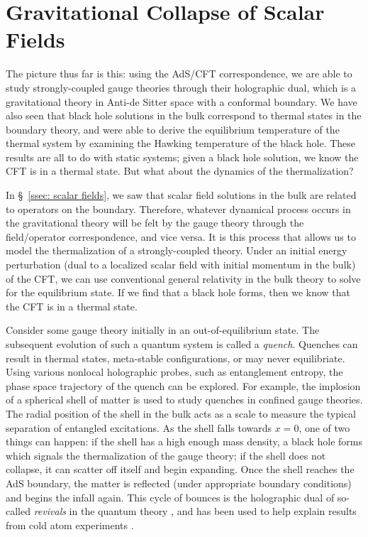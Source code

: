 \documentclass[../PhD.tex]{subfiles}
\begin{document}

\section{Gravitational Collapse of Scalar Fields}
\label{sec: grav collapse}

The picture thus far is this: using the AdS/CFT correspondence, we are able to study strongly-coupled gauge theories through their holographic dual, which is a gravitational theory in Anti-de Sitter space with a conformal boundary. We have also seen that black hole solutions in the bulk correspond to thermal states in the boundary theory, and were able to derive the equilibrium temperature of the thermal system by examining the Hawking temperature of the black hole. These results are all to do with static systems; given a black hole solution, we know the CFT is in a thermal state. But what about the dynamics of the thermalization? 

In \S~\!\ref{ssec: scalar fields}, we saw that scalar field solutions in the bulk are related to operators on the boundary. Therefore, whatever dynamical process occurs in the gravitational theory will be felt by the gauge theory through the field/operator correspondence, and vice versa. It is this process that allows us to model the thermalization of a strongly-coupled theory. Under an initial energy perturbation (dual to a localized scalar field with initial momentum in the bulk) of the CFT, we can use conventional general relativity in the bulk theory to solve for the equilibrium state. If we find that a black hole forms, then we know that the CFT is in a thermal state.

Consider some gauge theory initially in an out-of-equilibrium state. The subsequent evolution of such a quantum system is called a \emph{quench}. Quenches can result in thermal states, meta-stable configurations, or may never equilibriate. Using various nonlocal holographic probes, such as entanglement entropy, the phase space trajectory of the quench can be explored. For example, the implosion of a spherical shell of matter is used to study quenches in confined gauge theories. The radial position of the shell in the bulk acts as a scale to measure the typical separation of entangled excitations. As the shell falls towards $x = 0$, one of two things can happen: if the shell has a high enough mass density, a black hole forms which signals the thermalization of the gauge theory; if the shell does not collapse, it can scatter off itself and begin expanding. Once the shell reaches the AdS boundary, the matter is reflected (under appropriate boundary conditions) and begins the infall again. This cycle of bounces is the holographic dual of so-called \emph{revivals} in the quantum theory \cite{1410.6201, 1412.6002}, and has been used to help explain results from cold atom experiments \cite{Dziarmaga2010, 2011arXiv1106.3567L}.
\end{document}
